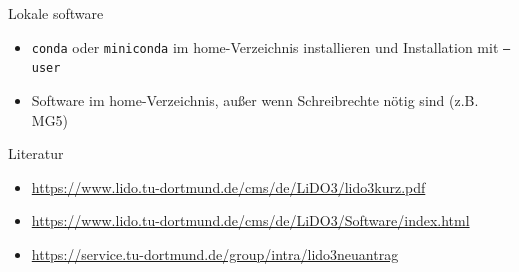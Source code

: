 \begin{frame}{Lokale software}
  \begin{itemize}
    \item \texttt{conda} oder \texttt{miniconda} im home-Verzeichnis installieren und Installation mit \texttt{--user}
    \item Software im home-Verzeichnis, außer wenn Schreibrechte nötig sind (z.B. MG5)
  \end{itemize}

\end{frame}

\begin{frame}{Literatur}
  \begin{itemize}
    \item \url{https://www.lido.tu-dortmund.de/cms/de/LiDO3/lido3kurz.pdf}
    \item \url{https://www.lido.tu-dortmund.de/cms/de/LiDO3/Software/index.html}
    \item \url{https://service.tu-dortmund.de/group/intra/lido3neuantrag}
  \end{itemize}
\end{frame}



